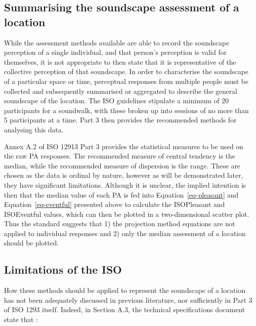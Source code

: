 \documentclass[
  authoryear,
  preprint,
  3p]{elsarticle}
\begin{document}
\hypertarget{summarising-the-soundscape-assessment-of-a-location}{%
\subsection{Summarising the soundscape assessment of a
location}\label{summarising-the-soundscape-assessment-of-a-location}}

While the assessment methods available are able to record the soundscape
perception of a single individual, and that person's perception is valid
for themselves, it is not appropriate to then state that it is
representative of the collective perception of that soundscape. In order
to characterise the soundscape of a particular space or time, perceptual
responses from multiple people must be collected and subsequently
summarised or aggregated to describe the general soundscape of the
location. The ISO guidelines stipulate a minimum of 20 participants for
a soundwalk, with these broken up into sessions of no more than 5
participants at a time. Part 3 then provides the recommended methods for
analysing this data.

Annex A.2 of ISO 12913 Part 3 provides the statistical measures to be
used on the raw PA responses. The recommended measure of central
tendency is the median, while the recommended measure of dispersion is
the range. These are chosen as the data is ordinal by nature, however as
will be demonstrated later, they have significant limitations. Although
it is unclear, the implied intention is then that the median value of
each PA is fed into Equation~\ref{eq-pleasant} and
Equation~\ref{eq-eventful} presented above to calculate the ISOPleasant
and ISOEventful values, which can then be plotted in a two-dimensional
scatter plot. Thus the standard suggests that 1) the projection method
equations are not applied to individual responses and 2) only the median
assessment of a location should be plotted.

\hypertarget{limitations-of-the-iso}{%
\subsection{Limitations of the ISO}\label{limitations-of-the-iso}}

How these methods should be applied to represent the soundscape of a
location has not been adequately discussed in previous literature, nor
sufficiently in Part 3 of ISO 1293 itself. Indeed, in Section A.3, the
technical specifications document state that \citep[5]{ISO12913_3}:
\end{document}

